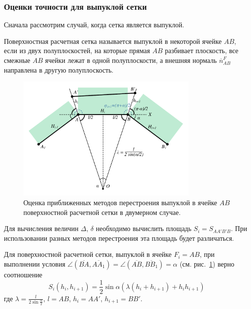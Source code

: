 \subsubsection{Оценки точности для выпуклой сетки}

Сначала рассмотрим случай, когда сетка является выпуклой.

\begin{definition}
Поверхностная расчетная сетка называется выпуклой в некоторой ячейке $AB$, если из двух полуплоскостей, на которые прямая $AB$ разбивает плоскость, все смежные $AB$ ячейки лежат в одной полуплоскости, а внешняя нормаль $\overline{n}_{AB}^F$ направлена в другую полуплоскость.
\end{definition}

\begin{figure}[ht]
\centering
\includegraphics[width=0.8\textwidth]{fig/2dr_theoretical_convex.pdf}
\singlespacing
{}\caption{Оценка приближенных методов перестроения выпуклой в ячейке $AB$ поверхностной расчетной сетки в двумерном случае.}
\label{fig:text_1_remesh_2d_theoretical}
\end{figure}

Для вычисления величин $\Delta$, $\delta$ необходимо вычислить площадь $S_i = S_{AA'B'B}$.
При использовании разных методов перестроения эта площадь будет различаться.

\begin{lemma}\label{lem:text_1_remesh2_vypukl_lemma}
Для поверхностной расчетной сетки, выпуклой в ячейке $F_i = AB$, при выполнении условия $\angle (\overline{BA}, \overline{AA_1}) = \angle (\overline{AB}, \overline{BB_1}) = \alpha$ (см. рис.~\ref{fig:text_1_remesh_2d_theoretical}) верно соотношение
\begin{equation}\label{eqn:text_1_remesh2_saa2b2b_gen}
S_i(h_i, h_{i + 1}) = \frac{1}{2} \sin \alpha \left( \lambda(h_i + h_{i+1}) + h_ih_{i+1} \right)
\end{equation}
где $\lambda = \frac{l}{2 \sin \frac{\alpha}{2}}$, $l = AB$, $h_i = AA'$, $h_{i + 1} = BB'$.
\end{lemma}

